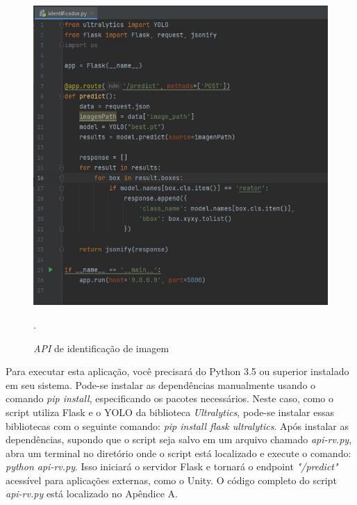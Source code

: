 \begin{figure}[!h]
    \centering
    \begin{minipage}{0.7\linewidth}
    \centering
    \captionsetup{justification=centering,margin=0.5cm,font=small}
    \includegraphics[width=1\linewidth]{img/cap5/API.jpeg}
    \caption{\textit{API} de identificação de imagem}.
    \label{fig:api-identificacao}
    \end{minipage}
\end{figure}

Para executar esta aplicação, você precisará do Python 3.5 ou superior instalado em seu sistema. Pode-se instalar as dependências manualmente usando o comando \textit{pip install}, especificando os pacotes necessários. Neste caso, como o script utiliza Flask e o YOLO da biblioteca \textit{Ultralytics}, pode-se instalar essas bibliotecas com o seguinte comando: \textit{pip install flask ultralytics}. Após instalar as dependências, supondo que o script seja salvo em um arquivo chamado \textit{api-rv.py}, abra um terminal no diretório onde o script está localizado e execute o comando: \textit{python api-rv.py}. Isso iniciará o servidor Flask e tornará o endpoint \textit{"/predict"} acessível para aplicações externas, como o Unity. O código completo do script \textit{api-rv.py} está localizado no Apêndice A.

